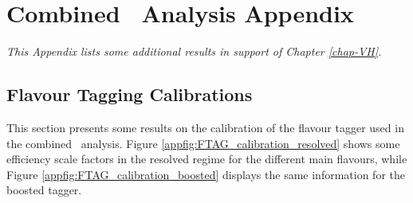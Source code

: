 \chapter{Combined \vhbc\ Analysis Appendix}
\ChapFrame

\textit{This Appendix lists some additional results in support of Chapter \ref{chap-VH}.}

%

\section{Flavour Tagging Calibrations}\label{appsec-vh-ftagcal}
This section presents some results on the calibration of the flavour tagger used in the combined \vhbc\ analysis. Figure \ref{appfig:FTAG_calibration_resolved} shows some efficiency scale factors in the resolved regime for the different main flavours, while Figure \ref{appfig:FTAG_calibration_boosted} displays the same information for the boosted tagger.

